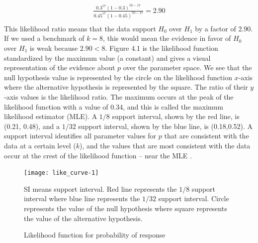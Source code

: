 \documentclass[12pt]{report}\usepackage[]{graphicx}\usepackage[]{color}
\newlength{\li}\setlength{\li}{14.48pt}
\newlength{\di}\setlength{\di}{-3.5mm}
\begin{document}
\begin{equation}
\begin{aligned}
\frac{0.3^{17}(1-0.3)^{50-17}}{0.45^{17}(1-0.45)^{50-17}} = 2.90 \\
\end{aligned}
\end{equation}
This likelihood ratio means that the data support $H_0$ over $H_1$ by a factor of 2.90. If we used a benchmark of $k=8$, this would mean the evidence in favor of $H_0$ over $H_1$ is weak because $2.90 < 8$. Figure 4.1 is the likelihood function standardized by the maximum value (a constant) and gives a visual representation of the evidence about $p$ over the parameter space.  We see that the null hypothesis value is represented by the circle on the likelihood function $x$-axis where the alternative hypothesis is represented by the square. The ratio of their $y$-axis values is the likelihood ratio. The maximum occurs at the peak of the likelihood function with a value of 0.34, and this is called the maximum likelihood estimator (MLE). A $1/8$ support interval, shown by the red line, is (0.21, 0.48), and a $1/32$ support interval, shown by the blue line, is (0.18,0.52). A support interval identifies all parameter values for $p$ that are consistent with the data at a certain level ($k$), and the values that are most consistent with the data occur at the crest of the likelihood function -- near the MLE \cite{Blume2002}. 

\begin{figure}
\caption{Likelihood function for probability of response}
\begin{Schunk}


\centerline{\texttt{[image: like\_curve-1]} }

\end{Schunk}
\centering
\begin{minipage}{0.6\textwidth} %
{\scriptsize SI means support interval. Red line represents the $1/8$ support interval where blue line represents the $1/32$ support interval. Circle represents the value of the null hypothesis where square represents the value of the alternative hypothesis.\par}
\end{minipage}
\end{figure}
\end{document}

